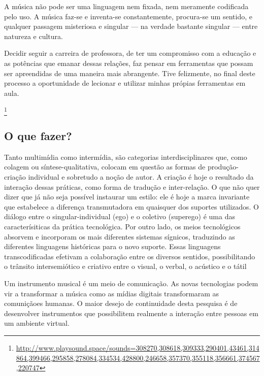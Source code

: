 \begin{citacao}
A música não pode ser uma linguagem nem fixada, nem meramente codificada pelo uso. A música faz-se e inventa-se constantemente, procura-se um sentido, e qualquer passagem misteriosa e singular — na verdade bastante singular — entre natureza e
cultura. \cite{Schaeffer2007}
\end{citacao}


Decidir seguir a carreira de professora, de ter um compromisso com a educação e as potências que emanar dessas relações, faz pensar em ferramentas que possam ser apreendidas de uma maneira mais abrangente. Tive felizmente, no final deste processo a oportunidade de lecionar e utilizar minhas própias ferramentas em aula.


\footnote{\url{http://www.playsound.space/sounds=308270,308618,309333,290401,43461,314864,399466,295858,278084,334534,428800,246658,357370,355118,356661,374567,220747}}









\subsection{O que fazer?} 

\begin{citacao}
Tanto multimídia como intermídia, são categorias interdisciplinares que, como colagem ou síntese-qualitativa, colocam em questão as formas de produção-criação individual e sobretudo a noção de autor. A criação é hoje o resultado da interação dessas práticas, como forma de tradução e inter-relação. O que não quer dizer que já não seja possível instaurar um estilo: ele é hoje a marca invariante que estabelece a diferença transmutadora em quaisquer dos suportes utilizados. O diálogo entre o singular-individual (ego) e o coletivo (superego) é uma das caracterísiticas da prática tecnológica. Por outro lado, os meios tecnológicos absorvem e incorporam os mais diferentes sistemas sígnicos, traduzindo as diferentes linguagens históricas para o novo suporte. Essas linguagens transcodificadas efetivam a colaboração entre os diversos sentidos, possibilitando o trânsito intersemiótico e criativo entre o visual, o verbal, o acústico e o tátil \cite[66]{JulioPlaza1969}
\end{citacao}

Um instrumento musical é um meio de comunicação. As novas tecnologias podem vir a transformar a música como as mídias digitais transformaram as comuniçãoes humanas. O maior desejo de continuidade desta pesquisa é de desenvolver instrumentos que possibilitem realmente a interação entre pessoas em um ambiente virtual. 

